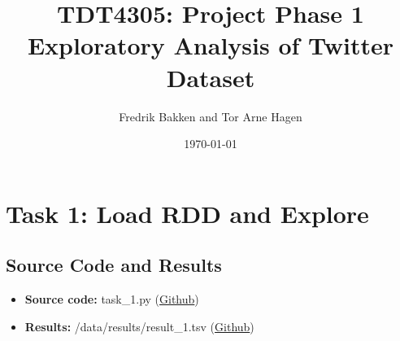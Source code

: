 \documentclass{article}
\title{TDT4305: Project Phase 1\\Exploratory Analysis of Twitter Dataset}
\author{Fredrik Bakken and Tor Arne Hagen}
\date{\today}
\begin{document}
\maketitle

\newpage

\section*{Task 1: Load RDD and Explore}
\subsection*{Source Code and Results}
    \begin{itemize}
        \item \textbf{Source code:} task\_1.py (\href{https://github.com/FredrikBakken/TDT4305_Big-Data-Project/blob/master/PhaseOne/task_1.py}{Github})
        \item \textbf{Results:} /data/results/result\_1.tsv (\href{https://github.com/FredrikBakken/TDT4305_Big-Data-Project/blob/master/PhaseOne/data/results/result_1.tsv}{Github})
    \end{itemize}
\end{document}
